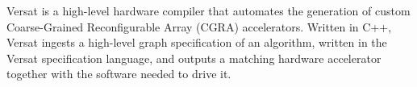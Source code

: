 %

Versat is a high-level hardware compiler that automates the generation of
custom Coarse-Grained Reconfigurable Array (CGRA) accelerators. Written in
C++, Versat ingests a high-level graph specification of an algorithm,
written in the Versat specification language, and outputs a matching
hardware accelerator together with the software needed to drive it.
